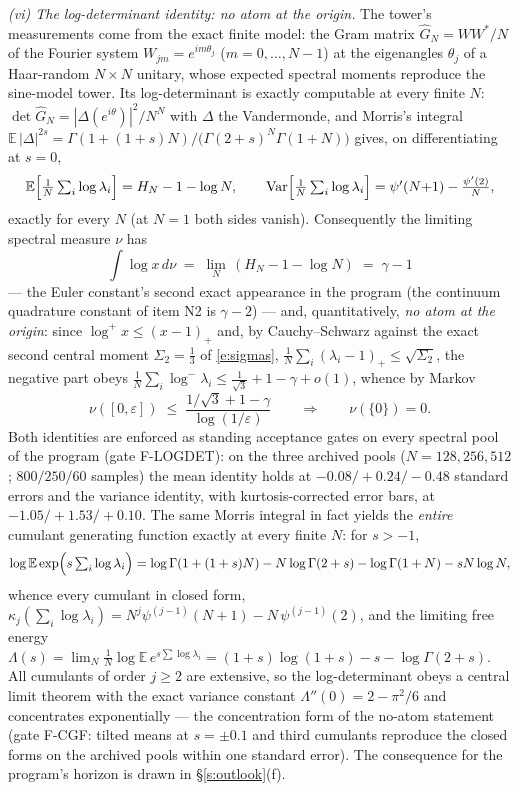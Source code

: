\documentclass[11pt]{article}
\numberwithin{equation}{section}
\theoremstyle{definition}
\theoremstyle{remark}
\begin{document}
\emph{(vi) The log-determinant identity: no atom at the
origin.} The tower's measurements come from the exact finite
model: the Gram matrix $\widehat G_N=WW^{*}/N$ of the Fourier
system $W_{jm}=e^{im\theta_j}$ ($m=0,\dots,N{-}1$) at the
eigenangles $\theta_j$ of a Haar-random $N\times N$ unitary,
whose expected spectral moments reproduce the sine-model
tower. Its log-determinant is exactly computable at every
finite $N$: $\det\widehat G_N=|\Delta(e^{i\theta})|^{2}/N^{N}$
with $\Delta$ the Vandermonde, and Morris's integral
$\mathbb E\,|\Delta|^{2s}
=\Gamma(1+(1+s)N)\big/\bigl(\Gamma(2+s)^{N}\Gamma(1+N)\bigr)$
gives, on differentiating at $s=0$,
\[
\mathbb E\Bigl[\tfrac1N\textstyle\sum_i\log\lambda_i\Bigr]
= H_N-1-\log N,
\qquad
\operatorname{Var}\Bigl[\tfrac1N\textstyle\sum_i\log\lambda_i\Bigr]
= \psi'(N{+}1)-\tfrac{\psi'(2)}N ,
\]
exactly for every $N$ (at $N=1$ both sides vanish).
Consequently the limiting spectral measure $\nu$ has
\[
\int\log x\,d\nu\;=\;\lim_{N}\,(H_N-1-\log N)\;=\;\gamma-1
\]
--- the Euler constant's second exact appearance in the
program (the continuum quadrature constant of item N2 is
$\gamma-2$) --- and, quantitatively, \emph{no atom at the
origin}: since $\log^{+}x\le(x-1)_{+}$ and, by
Cauchy--Schwarz against the exact second central moment
$\Sigma_2=\tfrac13$ of \eqref{e:sigmas},
$\tfrac1N\sum_i(\lambda_i-1)_{+}\le\sqrt{\Sigma_2}$, the
negative part obeys $\tfrac1N\sum_i\log^{-}\lambda_i\le
\tfrac1{\sqrt3}+1-\gamma+o(1)$, whence by Markov
\[
\nu([0,\varepsilon])\;\le\;
\frac{1/\sqrt3+1-\gamma}{\log(1/\varepsilon)}
\qquad\Longrightarrow\qquad \nu(\{0\})=0 .
\]
Both identities are enforced as standing acceptance gates on
every spectral pool of the program (gate F-LOGDET): on the
three archived pools ($N=128,256,512$; $800/250/60$ samples)
the mean identity holds at $-0.08/+0.24/-0.48$ standard errors
and the variance identity, with kurtosis-corrected error bars,
at $-1.05/+1.53/+0.10$. The same Morris integral in fact
yields the \emph{entire} cumulant generating function exactly
at every finite $N$: for $s>-1$,
\[
\log\mathbb E\exp\Bigl(s\,{\textstyle\sum_i}\log\lambda_i\Bigr)
=\log\Gamma(1+(1+s)N)-N\log\Gamma(2+s)-\log\Gamma(1+N)
-sN\log N,
\]
whence every cumulant in closed form,
$\kappa_j(\sum_i\log\lambda_i)
=N^{j}\psi^{(j-1)}(N+1)-N\,\psi^{(j-1)}(2)$, and the limiting
free energy
$\Lambda(s)=\lim_N\frac1N\log\mathbb E\,e^{s\sum\log\lambda_i}
=(1+s)\log(1+s)-s-\log\Gamma(2+s)$. All cumulants of order
$j\ge2$ are extensive, so the log-determinant obeys a central
limit theorem with the exact variance constant
$\Lambda''(0)=2-\pi^{2}/6$ and concentrates exponentially ---
the concentration form of the no-atom statement (gate F-CGF:
tilted means at $s=\pm0.1$ and third cumulants reproduce the
closed forms on the archived pools within one standard error).
The consequence for the program's
horizon is drawn in \S\ref{s:outlook}(f).
\end{document}
